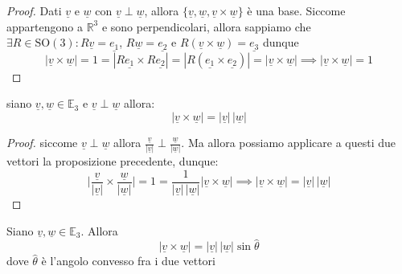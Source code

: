 %
\begin{proof}
Dati $\underline{v}$ e $\underline{w}$ con $\underline{v} \perp \underline{w}$, allora $\{\underline{v}, \underline{w}, \underline{v} \times \underline{w} \}$ è una base. Siccome appartengono a $\mathbb{R}^3$ e sono perpendicolari, allora sappiamo che $\exists R \in \text{SO}(3): R\underline{v} = \underline{e_1}$, $R\underline{w} = \underline{e_2}$ e $R(\underline{v} \times \underline{w}) = \underline{e_3}$ dunque
\[
|\underline{v} \times \underline{w}| = 1 = |R\underline{e_1} \times R\underline{e_2}|= |R(\underline{e_1} \times \underline{e_2})| = |\underline{v} \times \underline{w}| \implies |\underline{v} \times \underline{w}| = 1
\]
\end{proof}
%
\vspace{0.5cm}
\begin{cor}
siano $\underline{v}, \underline{w} \in \mathbb{E}_3$ e $\underline{v} \perp \underline{w}$ allora:
\[|\underline{v} \times \underline{w}| = |\underline{v}| \, |\underline{w}|\]
\end{cor}
%
\begin{proof}
siccome $\underline{v} \perp \underline{w}$ allora $\frac{\underline{v}}{|\underline{v}|} \perp \frac{\underline{w}}{|\underline{w}|}$. Ma allora possiamo applicare a questi due vettori la proposizione precedente, dunque:
%
\[\Big|\frac{\underline{v}}{|\underline{v}|} \times \frac{\underline{w}}{|\underline{w}|} \Big| = 1 = \frac{1}{|\underline{v}| \, |\underline{w}|} |\underline{v} \times \underline{w}| \implies |\underline{v} \times \underline{w}| = |\underline{v}| \, |\underline{w}|\]
\end{proof}
%
\vspace{0.5cm}
\begin{prop}[\textcolor{blue}{area del parallelogramma}]
Siano $\underline{v}, \underline{w} \in \mathbb{E}_3$. Allora \[|\underline{v} \times \underline{w}| = |\underline{v}| \, |\underline{w}| \sin{\hat{\theta}}\]
dove $\hat{\theta}$ è l'angolo convesso fra i due vettori
\end{prop}
%
